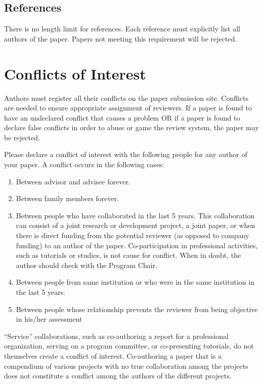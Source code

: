 \documentclass{sig-alternate}
\begin{document}
\subsection{References}

There is no length limit for references. Each reference must explicitly list all authors of the paper. Papers not meeting this requirement will be rejected.

\section{Conflicts of Interest}

Authors must register all their conflicts on the paper submission site. Conflicts are needed to ensure appropriate assignment of reviewers. If a paper is found to have an undeclared conflict that causes a problem OR if a paper is found to declare false conflicts in order to abuse or game the review system, the paper may be rejected.

Please declare a conflict of interest with the following people for any author of your paper.
A conflict occurs in the following cases:
\begin{enumerate}
\item Between advisor and advisee forever. 
\item Between family members forever. 
\item Between people who have collaborated in the last 5 years. This collaboration can consist of a joint research or development project, a joint paper, or when there is direct funding from the potential reviewer (as opposed to company funding) to an author of the paper. Co-participation in professional activities, such as tutorials or studies, is not cause for conflict. When in doubt, the author should check with the Program Chair. 
\item Between people from same institution or who were in the same institution in the last 5 years. 
\item Between people whose relationship prevents the reviewer from being objective in his/her assessment
\end{enumerate}


``Service'' collaborations, such as co-authoring a report for a professional organization, serving on a program committee, or co-presenting tutorials, do not themselves create a conflict of interest. Co-authoring a paper that is a compendium of various projects with no true collaboration among the projects does not constitute a conflict among the authors of the different projects.
\end{document}
